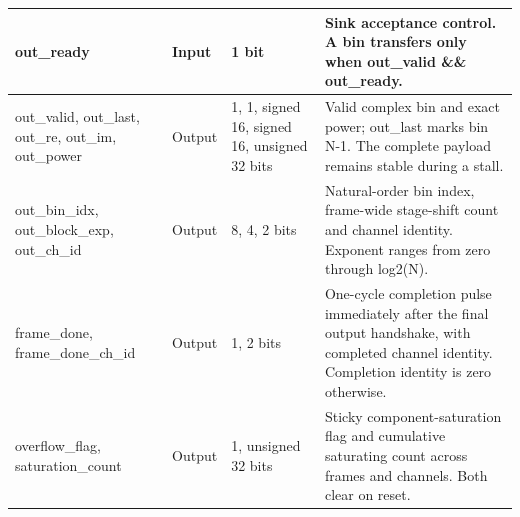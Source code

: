 \documentclass[11pt,a4paper]{article}
\begin{document}
{\begin{longtable}{@{}L{0.21\textwidth}|L{0.12\textwidth}|L{0.12\textwidth}|L{0.45\textwidth}@{}}
out\_\allowbreak{}ready & Input & 1 bit & Sink acceptance control. A bin transfers only when out\_\allowbreak{}valid \&\& out\_\allowbreak{}ready.\\[2pt]\hline

out\_\allowbreak{}valid,\allowbreak{} out\_\allowbreak{}last,\allowbreak{} out\_\allowbreak{}re,\allowbreak{} out\_\allowbreak{}im,\allowbreak{} out\_\allowbreak{}power & Output & 1,\allowbreak{} 1,\allowbreak{} signed 16,\allowbreak{} signed 16,\allowbreak{} unsigned 32 bits & Valid complex bin and exact power; out\_\allowbreak{}last marks bin N-1. The complete payload remains stable during a stall.\\[2pt]\hline

out\_\allowbreak{}bin\_\allowbreak{}idx,\allowbreak{} out\_\allowbreak{}block\_\allowbreak{}exp,\allowbreak{} out\_\allowbreak{}ch\_\allowbreak{}id & Output & 8,\allowbreak{} 4,\allowbreak{} 2 bits & Natural-order bin index,\allowbreak{} frame-wide stage-shift count and channel identity. Exponent ranges from zero through log2(\allowbreak{}N)\allowbreak{}.\\[2pt]\hline

frame\_\allowbreak{}done,\allowbreak{} frame\_\allowbreak{}done\_\allowbreak{}ch\_\allowbreak{}id & Output & 1,\allowbreak{} 2 bits & One-cycle completion pulse immediately after the final output handshake,\allowbreak{} with completed channel identity. Completion identity is zero otherwise.\\[2pt]\hline

overflow\_\allowbreak{}flag,\allowbreak{} saturation\_\allowbreak{}count & Output & 1,\allowbreak{} unsigned 32 bits & Sticky component-saturation flag and cumulative saturating count across frames and channels. Both clear on reset.\\[2pt]\hline

\bottomrule\end{longtable}}
\end{document}

